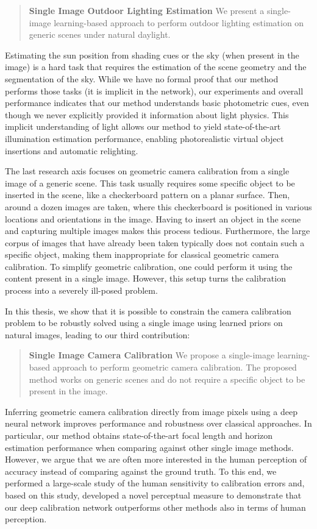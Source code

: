 \begin{quotation}
\textbf{Single Image Outdoor Lighting Estimation} We present a single-image learning-based approach to perform outdoor lighting estimation on generic scenes under natural daylight. 
\end{quotation}

Estimating the sun position from shading cues or the sky (when present in the image) is a hard task that requires the estimation of the scene geometry and the segmentation of the sky. While we have no formal proof that our method performs those tasks (it is implicit in the network), our experiments and overall performance indicates that our method understands basic photometric cues, even though we never explicitly provided it information about light physics. This implicit understanding of light allows our method to yield state-of-the-art illumination estimation performance, enabling photorealistic virtual object insertions and automatic relighting. 

The last research axis focuses on geometric camera calibration from a single image of a generic scene. This task usually requires some specific object to be inserted in the scene, like a checkerboard pattern on a planar surface. Then, around a dozen images are taken, where this checkerboard is positioned in various locations and orientations in the image. Having to insert an object in the scene and capturing multiple images makes this process tedious. Furthermore, the large corpus of images that have already been taken typically does not contain such a specific object, making them inappropriate for classical geometric camera calibration. To simplify geometric calibration, one could perform it using the content present in a single image. However, this setup turns the calibration process into a severely ill-posed problem. 

In this thesis, we show that it is possible to constrain the camera calibration problem to be robustly solved using a single image using learned priors on natural images, leading to our third contribution: 

\begin{quotation}
\textbf{Single Image Camera Calibration} We propose a single-image learning-based approach to perform geometric camera calibration. The proposed method works on generic scenes and do not require a specific object to be present in the image. 
\end{quotation}

Inferring geometric camera calibration directly from image pixels using a deep neural network improves performance and robustness over classical approaches. In particular, our method obtains state-of-the-art focal length and horizon estimation performance when comparing against other single image methods. However, we argue that we are often more interested in the human perception of accuracy instead of comparing against the ground truth. To this end, we performed a large-scale study of the human sensitivity to calibration errors and, based on this study, developed a novel perceptual measure to demonstrate that our deep calibration network outperforms other methods also in terms of human perception. 

